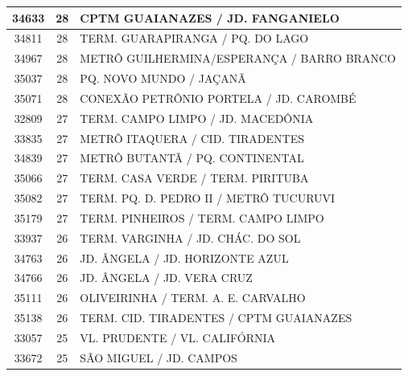 \documentclass[
	12pt,				%
	oneside,			%
	a4paper,			%
	english,			%
	brazil				%
	]{abntex2ppgsi}
\begin{document}
\begin{apendicesenv}
\begin{longtable}{c|c|p{7cm}}
    34633 & 28    & CPTM GUAIANAZES / JD. FANGANIELO \\
\hline

    34811 & 28    & TERM. GUARAPIRANGA / PQ. DO LAGO \\
\hline

    34967 & 28    & METRÔ GUILHERMINA/ESPERANÇA / BARRO BRANCO \\
\hline

    35037 & 28    & PQ. NOVO MUNDO / JAÇANÃ \\
\hline

    35071 & 28    & CONEXÃO PETRÔNIO PORTELA / JD. CAROMBÉ \\
\hline

    32809 & 27    & TERM. CAMPO LIMPO / JD. MACEDÔNIA \\
\hline

    33835 & 27    & METRÔ ITAQUERA / CID. TIRADENTES \\
\hline

    34839 & 27    & METRÔ BUTANTÃ / PQ. CONTINENTAL \\
\hline

    35066 & 27    & TERM. CASA VERDE / TERM. PIRITUBA \\
\hline

    35082 & 27    & TERM. PQ. D. PEDRO II / METRÔ TUCURUVI \\
\hline

    35179 & 27    & TERM. PINHEIROS / TERM. CAMPO LIMPO \\
\hline

    33937 & 26    & TERM. VARGINHA / JD. CHÁC. DO SOL \\
\hline

    34763 & 26    & JD. ÂNGELA / JD. HORIZONTE AZUL \\
\hline

    34766 & 26    & JD. ÂNGELA / JD. VERA CRUZ \\
\hline

    35111 & 26    & OLIVEIRINHA / TERM. A. E. CARVALHO \\
\hline

    35138 & 26    & TERM. CID. TIRADENTES / CPTM GUAIANAZES \\
\hline

    33057 & 25    & VL. PRUDENTE / VL. CALIFÓRNIA \\
\hline

    33672 & 25    & SÃO MIGUEL / JD. CAMPOS \\
\hline


\end{longtable}
\end{apendicesenv}
\end{document}
